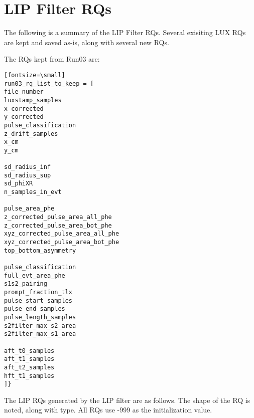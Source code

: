 
\chapter{LIP Filter RQs}

\label{app:lipfilter}

The following is a summary of the \ac{LIP} Filter \ac{RQ}s. Several  exisiting \ac{LUX} \ac{RQ}s are kept and saved as-is, along with several new \ac{RQ}s. 

The \ac{RQ}s kept from Run03 are:

\begin{verbatim}[fontsize=\small]
run03_rq_list_to_keep = [
file_number
luxstamp_samples
x_corrected
y_corrected
pulse_classification
z_drift_samples
x_cm
y_cm

sd_radius_inf
sd_radius_sup
sd_phiXR
n_samples_in_evt

pulse_area_phe
z_corrected_pulse_area_all_phe
z_corrected_pulse_area_bot_phe
xyz_corrected_pulse_area_all_phe
xyz_corrected_pulse_area_bot_phe
top_bottom_asymmetry

pulse_classification
full_evt_area_phe
s1s2_pairing
prompt_fraction_tlx
pulse_start_samples
pulse_end_samples
pulse_length_samples
s2filter_max_s2_area
s2filter_max_s1_area

aft_t0_samples
aft_t1_samples
aft_t2_samples
hft_t1_samples
]}
\end{verbatim}

The \ac{LIP} \ac{RQ}s generated by the \ac{LIP} filter are as follows. The shape of the \ac{RQ} is noted, along with type. All \ac{RQ}s use -999 as the initialization value. 


